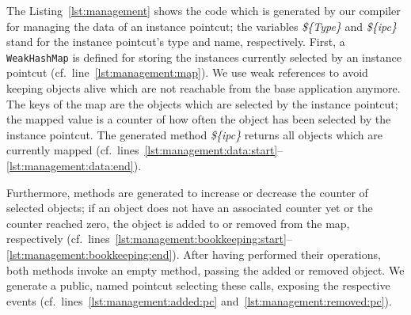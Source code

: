 \documentclass{acm_proc_article-sp}
\begin{document}
The Listing~\ref{lst:management} shows the code which is generated by our compiler for managing the data of an instance pointcut; the variables \emph{\$\{Type\}} and \emph{\$\{ipc\}} stand for the instance pointcut's type and name, respectively.
First, a \lstinline{WeakHashMap} is defined for storing the instances currently selected by an instance pointcut (cf.\ line~\ref{lst:management:map}).
We use weak references to avoid keeping objects alive which are not reachable from the base application anymore.
The keys of the map are the objects which are selected by the instance pointcut; the mapped value is a counter of how often the object has been selected by the instance pointcut.
The generated method \emph{\$\{ipc\}} returns all objects which are currently mapped (cf.\ lines~\ref{lst:management:data:start}--\ref{lst:management:data:end}).

Furthermore, methods are generated to increase or decrease the counter of selected objects; if an object does not have an associated counter yet or the counter reached zero, the object is added to or removed from the map, respectively (cf.\ lines~\ref{lst:management:bookkeeping:start}--\ref{lst:management:bookkeeping:end}).
After having performed their operations, both methods invoke an empty method, passing the added or removed object.
We generate a public, named pointcut selecting these calls, exposing the respective events (cf.\ lines~\ref{lst:management:added:pc} and~\ref{lst:management:removed:pc}).
\end{document}

